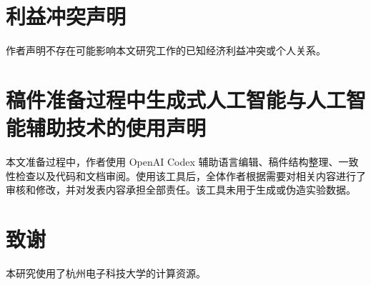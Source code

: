 \documentclass[preprint,12pt,authoryear]{elsarticle}
\begin{document}
\section*{利益冲突声明}
作者声明不存在可能影响本文研究工作的已知经济利益冲突或个人关系。

\section*{稿件准备过程中生成式人工智能与人工智能辅助技术的使用声明}
本文准备过程中，作者使用 OpenAI Codex 辅助语言编辑、稿件结构整理、一致性检查以及代码和文档审阅。使用该工具后，全体作者根据需要对相关内容进行了审核和修改，并对发表内容承担全部责任。该工具未用于生成或伪造实验数据。

\section*{致谢}
本研究使用了杭州电子科技大学的计算资源。



\end{document}
